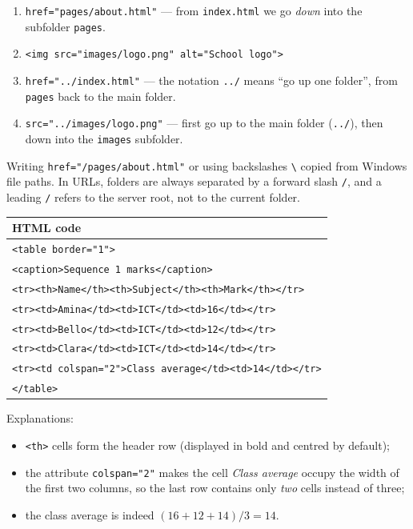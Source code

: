 \documentclass[11pt]{article}
\begin{document}
\begin{corrige}
\begin{enumerate}
\item \texttt{href="pages/about.html"} — from \texttt{index.html} we go \emph{down} into the subfolder \texttt{pages}.
\item \texttt{<img src="images/logo.png" alt="School logo">}
\item \texttt{href="../index.html"} — the notation \texttt{../} means ``go up one folder'', from \texttt{pages} back to the main folder.
\item \texttt{src="../images/logo.png"} — first go up to the main folder (\texttt{../}), then down into the \texttt{images} subfolder.
\end{enumerate}
\end{corrige}

\begin{attention}
Writing \texttt{href="/pages/about.html"} or using backslashes \texttt{\textbackslash} copied from Windows file paths. In URLs, folders are always separated by a forward slash \texttt{/}, and a leading \texttt{/} refers to the server root, not to the current folder.
\end{attention}

\begin{corrige}
\begin{center}
\begin{tabular}{|l|}
\hline
\rowcolor{popblueL} \textbf{HTML code} \\
\hline
\texttt{<table border="1">} \\
\texttt{<caption>Sequence 1 marks</caption>} \\
\texttt{<tr><th>Name</th><th>Subject</th><th>Mark</th></tr>} \\
\texttt{<tr><td>Amina</td><td>ICT</td><td>16</td></tr>} \\
\texttt{<tr><td>Bello</td><td>ICT</td><td>12</td></tr>} \\
\texttt{<tr><td>Clara</td><td>ICT</td><td>14</td></tr>} \\
\texttt{<tr><td colspan="2">Class average</td><td>14</td></tr>} \\
\texttt{</table>} \\
\hline
\end{tabular}
\end{center}
Explanations:
\begin{itemize}
\item \texttt{<th>} cells form the header row (displayed in bold and centred by default);
\item the attribute \texttt{colspan="2"} makes the cell \emph{Class average} occupy the width of the first two columns, so the last row contains only \emph{two} cells instead of three;
\item the class average is indeed $(16+12+14)/3 = 14$.
\end{itemize}
\end{corrige}
\end{document}
